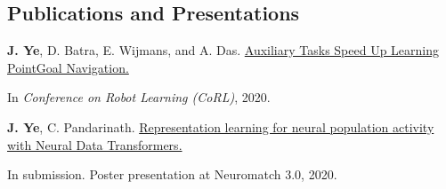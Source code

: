 \subsection*{Publications and Presentations}
    \textbf{J. Ye}, D. Batra, E. Wijmans, and A. Das.
    \href{https://arxiv.org/abs/2007.04561}
    {Auxiliary Tasks Speed Up Learning PointGoal Navigation.}

    In \emph{Conference on Robot Learning (CoRL)}, 2020.

    \textbf{J. Ye}, C. Pandarinath. \href{https://www.youtube.com/watch?v=lEXSdoIGNWY}
    {Representation learning for neural population activity with Neural Data Transformers.}

    In submission. Poster presentation at Neuromatch 3.0, 2020.

